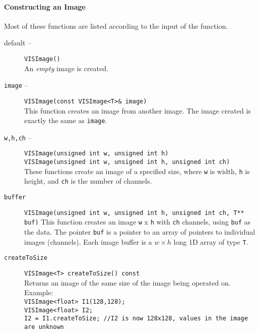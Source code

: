 \paragraph{Constructing an Image}
Most of these functions are listed according to the input of the function.
\begin{description}
\item[default --]
{\tt VISImage()}\\
An {\em empty} image is created.
\item[{\tt image} --]
{\tt VISImage(const VISImage<T>\& image)}\\
This function creates an image from another image.
The image created is exactly the same as {\tt image}.
\item[{\tt w,h,ch} --]
{\tt VISImage(unsigned int w, unsigned int h)}\\
{\tt VISImage(unsigned int w, unsigned int h, unsigned int ch)}\\
These functions create an image of a specified size,
where {\tt w} is width, {\tt h} is height, and {\tt ch}
is the number of channels.
\item[{\tt buffer}]
{\tt VISImage(unsigned int w, unsigned int h, unsigned int ch, T** buf)}
This function creates an image {\tt w} x {\tt h} with {\tt ch}
channels, using {\tt buf} as the data.
The pointer {\tt buf} is a pointer to an array of pointers to 
individual images (channels).  Each image buffer is a $w\times h$ 
long 1D array of type {\tt T}.
\item[{\tt createToSize}]
{\tt VISImage<T> createToSize() const}\\
Returns an image of the same size of the image being operated on.  Example:\\
{\tt VISImage<float> I1(128,128);}\\
{\tt VISImage<float> I2;}\\
{\tt I2 = I1.createToSize; //I2 is now 128x128, values in the image are unknown}
\end{description}

